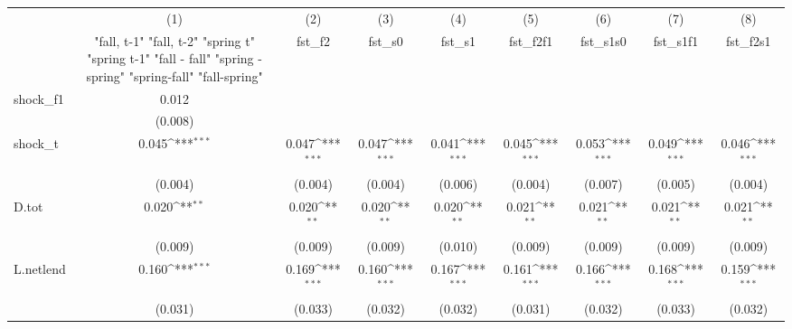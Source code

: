{
\def\sym#1{\ifmmode^{#1}\else\(^{#1}\)\fi}
\begin{tabular}{l*{8}{c}}
\toprule
            &\multicolumn{1}{c}{(1)}&\multicolumn{1}{c}{(2)}&\multicolumn{1}{c}{(3)}&\multicolumn{1}{c}{(4)}&\multicolumn{1}{c}{(5)}&\multicolumn{1}{c}{(6)}&\multicolumn{1}{c}{(7)}&\multicolumn{1}{c}{(8)}\\
            &\multicolumn{1}{c}{  "fall, t-1" "fall, t-2" "spring t" "spring t-1"  "fall - fall" "spring - spring" "spring-fall" "fall-spring" }&\multicolumn{1}{c}{fst\_f2}&\multicolumn{1}{c}{fst\_s0}&\multicolumn{1}{c}{fst\_s1}&\multicolumn{1}{c}{fst\_f2f1}&\multicolumn{1}{c}{fst\_s1s0}&\multicolumn{1}{c}{fst\_s1f1}&\multicolumn{1}{c}{fst\_f2s1}\\
\midrule
shock\_f1    &       0.012         &                     &                     &                     &                     &                     &                     &                     \\
            &     (0.008)         &                     &                     &                     &                     &                     &                     &                     \\
\addlinespace
shock\_t     &       0.045\sym{***}&       0.047\sym{***}&       0.047\sym{***}&       0.041\sym{***}&       0.045\sym{***}&       0.053\sym{***}&       0.049\sym{***}&       0.046\sym{***}\\
            &     (0.004)         &     (0.004)         &     (0.004)         &     (0.006)         &     (0.004)         &     (0.007)         &     (0.005)         &     (0.004)         \\
\addlinespace
D.tot       &       0.020\sym{**} &       0.020\sym{**} &       0.020\sym{**} &       0.020\sym{**} &       0.021\sym{**} &       0.021\sym{**} &       0.021\sym{**} &       0.021\sym{**} \\
            &     (0.009)         &     (0.009)         &     (0.009)         &     (0.010)         &     (0.009)         &     (0.009)         &     (0.009)         &     (0.009)         \\
\addlinespace
L.netlend   &       0.160\sym{***}&       0.169\sym{***}&       0.160\sym{***}&       0.167\sym{***}&       0.161\sym{***}&       0.166\sym{***}&       0.168\sym{***}&       0.159\sym{***}\\
            &     (0.031)         &     (0.033)         &     (0.032)         &     (0.032)         &     (0.031)         &     (0.032)         &     (0.033)         &     (0.032)         \\

\end{tabular}}
